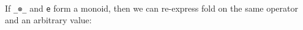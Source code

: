 \begin{fence}
\begin{code}
\AgdaSymbol{\{}\AgdaSpace{}%
\AgdaSymbol{:}\AgdaSpace{}%
\AgdaSymbol{\}}\AgdaSpace{}%
\AgdaSpace{}%
\AgdaSpace{}%
\AgdaSymbol{\{}\AgdaSpace{}%
\AgdaSymbol{\}}\AgdaSpace{}%
\AgdaOperator{\AgdaFunction{\AgdaUnderscore{}++\AgdaUnderscore{}}}\AgdaSpace{}%
\AgdaInductiveConstructor{[]}\<%
\\
\>[0]\AgdaSpace{}%
\AgdaSymbol{=}\<%
\\
\>[0][@{}l@{\AgdaIndent{0}}]%
\>[2]\<%
\\
\>[2][@{}l@{\AgdaIndent{0}}]%
\>[4]\AgdaSymbol{\{}\AgdaSpace{}%
\AgdaSpace{}%
\AgdaSymbol{=}\AgdaSpace{}%
\<%
\\
%
\>[4]\AgdaSymbol{;}\AgdaSpace{}%
\AgdaSpace{}%
\AgdaSymbol{=}\AgdaSpace{}%
\<%
\\
%
\>[4]\AgdaSymbol{;}\AgdaSpace{}%
\AgdaSpace{}%
\AgdaSymbol{=}\AgdaSpace{}%
\<%
\\
%
\>[4]\AgdaSymbol{\}}\<%
\end{code}
\end{fence}

If \texttt{\_⊗\_} and \texttt{e} form a monoid, then we can re-express
fold on the same operator and an arbitrary value:

